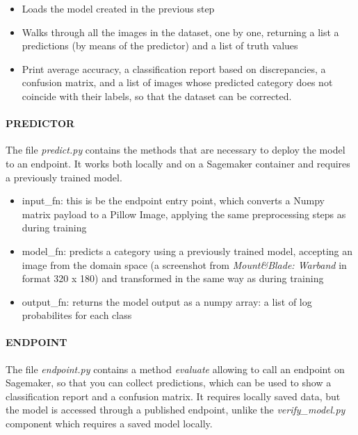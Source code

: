 \documentclass[
]{article}
\providecommand{\tightlist}{%
  \setlength{\itemsep}{0pt}\setlength{\parskip}{0pt}}
\begin{document}
\begin{itemize}
\tightlist
\item
  Loads the model created in the previous step
\item
  Walks through all the images in the dataset, one by one, returning a list a predictions (by means of the predictor)  and a list of truth values
\item
  Print average accuracy, a classification report based on
  discrepancies, a confusion matrix, and a list of images whose
  predicted category does not coincide with their labels, so that the
  dataset can be corrected.
\end{itemize}

\hypertarget{predictor}{%
\paragraph{PREDICTOR}\label{predictor}}

The file \emph{predict.py} contains the methods that are necessary to
deploy the model to an endpoint. It works both locally and on a
Sagemaker container and requires a previously trained model.

\begin{itemize}
\tightlist
\item
  input\_fn: this is be the endpoint entry point, which converts a Numpy
  matrix payload to a Pillow Image, applying the same preprocessing
  steps as during training
\item
  model\_fn: predicts a category using a previously trained model,
  accepting an image from the domain space (a screenshot from
  \emph{Mount\&Blade: Warband} in format 320 x 180) and transformed in
  the same way as during training
\item
  output\_fn: returns the model output as a numpy array: a list of log
  probabilites for each class
\end{itemize}

\hypertarget{endpoint}{%
\paragraph{ENDPOINT}\label{endpoint}}

The file \emph{endpoint.py} contains a method \emph{evaluate} allowing
to call an endpoint on Sagemaker, so that you can collect predictions,
which can be used to show a classification report and a confusion
matrix. It requires locally saved data, but the model is accessed
through a published endpoint, unlike the \emph{verify\_model.py}
component which requires a saved model locally.
\end{document}
